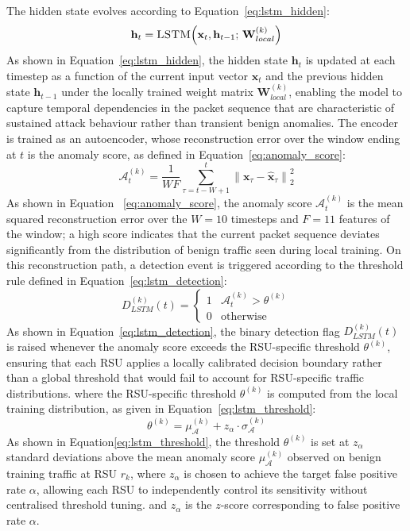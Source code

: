 \documentclass[12pt, a4paper]{report}
\begin{document}
The hidden state evolves
according to Equation~\eqref{eq:lstm_hidden}:
\begin{equation}
\mathbf{h}_t = \textsc{LSTM}\!\left(\mathbf{x}_t, \mathbf{h}_{t-1};\,
\mathbf{W}_{local}^{(k)}\right)
\label{eq:lstm_hidden}
\end{equation}
As shown in Equation~\eqref{eq:lstm_hidden}, the hidden state
$\mathbf{h}_t$ is updated at each timestep as a function of the
current input vector $\mathbf{x}_t$ and the previous hidden state
$\mathbf{h}_{t-1}$ under the locally trained weight matrix
$\mathbf{W}_{local}^{(k)}$, enabling the model to capture temporal
dependencies in the packet sequence that are characteristic of
sustained attack behaviour rather than transient benign anomalies.
The encoder is trained as an autoencoder, whose
reconstruction error over the window ending at $t$ is the anomaly score,
as defined in Equation~\eqref{eq:anomaly_score}:
\begin{equation}
\mathcal{A}_t^{(k)} =
\frac{1}{WF}\sum_{\tau=t-W+1}^{t}
\left\|\mathbf{x}_\tau - \hat{\mathbf{x}}_\tau\right\|_2^2
\label{eq:anomaly_score}
\end{equation}
As shown in Equation ~\eqref{eq:anomaly_score}, the anomaly
score $\mathcal{A}_t^{(k)}$ is the mean squared reconstruction
error over the $W{=}10$ timesteps and $F{=}11$ features of the
window; a high score
indicates that the current packet sequence deviates significantly
from the distribution of benign traffic seen during local training.
On this reconstruction path, a detection event is triggered
according to the threshold rule defined in
Equation~\eqref{eq:lstm_detection}:
\begin{equation}
D_{LSTM}^{(k)}(t) =
\begin{cases}
1 & \mathcal{A}_t^{(k)} > \theta^{(k)} \\
0 & \text{otherwise}
\end{cases}
\label{eq:lstm_detection}
\end{equation}
As shown in Equation~\eqref{eq:lstm_detection}, the binary
detection flag $D_{LSTM}^{(k)}(t)$ is raised whenever the anomaly
score exceeds the RSU-specific threshold $\theta^{(k)}$, ensuring
that each RSU applies a locally calibrated decision boundary rather
than a global threshold that would fail to account for
RSU-specific traffic distributions.
where the RSU-specific threshold $\theta^{(k)}$ is computed from the
local training distribution,
as given in Equation~\eqref{eq:lstm_threshold}:
\begin{equation}
\theta^{(k)} = \mu_{\mathcal{A}}^{(k)} + z_\alpha \cdot \sigma_{\mathcal{A}}^{(k)}
\label{eq:lstm_threshold}
\end{equation}
As shown in Equation\eqref{eq:lstm_threshold}, the threshold
$\theta^{(k)}$ is set at $z_\alpha$ standard deviations above the
mean anomaly score $\mu_{\mathcal{A}}^{(k)}$ observed on benign
training traffic at RSU $r_k$, where $z_\alpha$ is chosen to achieve
the target false positive rate $\alpha$, allowing each RSU to
independently control its sensitivity without centralised threshold
tuning.
and $z_\alpha$ is the $z$-score corresponding to false positive rate
$\alpha$.
\end{document}
